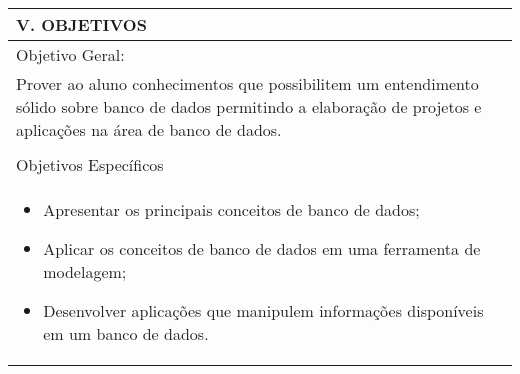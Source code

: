 \documentclass[12pt]{article}
\begin{document}
\newpage



\begin{longtable}{|L{1.025\textwidth}|} \hline
%
{\bf V. OBJETIVOS } \\ \hline
%
Objetivo Geral:\\

Prover ao aluno conhecimentos que possibilitem um entendimento sólido sobre banco de dados permitindo a elaboração de projetos e aplicações na área de banco de dados.\\
\\
Objetivos Específicos \\
\begin{itemize} 
\item Apresentar os principais conceitos de banco de dados;
\item Aplicar os conceitos de banco de dados em uma ferramenta de modelagem;
\item Desenvolver aplicações que manipulem informações disponíveis em um banco de dados.
\end{itemize}
\\ \hline
\end{longtable}
\end{document}
